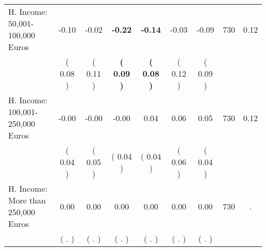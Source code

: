 \begin{tabular}{lcccccccc}
H. Income: 50,001-100,000 Euros &     -0.10 &     -0.02 & \textbf{    -0.22} & \textbf{    -0.14} &     -0.03 &     -0.09 & 730 &       0.12 \\ 
 & (     0.08 ) & (     0.11 ) & \textbf{(     0.09 )} & \textbf{(     0.08 )} & (     0.12 ) & (     0.09 ) & \\
H. Income: 100,001-250,000 Euros &     -0.00 &     -0.00 &     -0.00 &      0.04 &      0.06 &      0.05 & 730 &       0.12 \\ 
 & (     0.04 ) & (     0.05 ) & (     0.04 ) & (     0.04 ) & (     0.06 ) & (     0.04 ) & \\
H. Income: More than 250,000 Euros &      0.00 &      0.00 &      0.00 &      0.00 &      0.00 &      0.00 & 730 &          . \\ 
 & (        . ) & (        . ) & (        . ) & (        . ) & (        . ) & (        . ) & \\
\bottomrule
\end{tabular}
